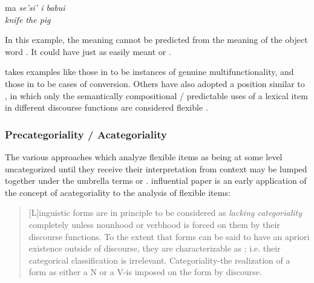 \begin{exe}
  \ex\label{ex:2.6}
  \vfix
  \gll ma       \em{se'si'} i   babui\\
        \em{knife}  the pig\\
  \vfix
\end{exe}

\noindent In this example, the meaning  cannot be predicted from the meaning of the object word . It could have just as easily meant  or .

 takes examples like those in  to be instances of genuine multifunctionality, and those in  to be cases of conversion. Others have also adopted a position similar to , in which only the semantically compositional / predictable uses of a lexical item in different discourse functions are considered flexible \parencites[§2.2.2--§2.2.3]{Croft2001b}[§3.2]{EvansOsada2005}.

\subsubsection{Precategoriality / Acategoriality}
\label{sec:2.3.1.4}

The various approaches which analyze flexible items as being at some level uncategorized until they receive their interpretation from context may be lumped together under the umbrella terms  or .  influential \parencite*{HopperThompson1984} paper is an early application of the concept of acategoriality to the analysis of flexible items:

\blockquote[{\cite[747]{HopperThompson1984}}]{[L]inguistic forms are in principle to be considered as \emph{lacking categoriality} completely unless nounhood or verbhood is forced on them by their discourse functions. To the extent that forms can be said to have an apriori existence outside of discourse, they are characterizable as ; i.e. their categorical classification is irrelevant. Categoriality-the realization of a form as either a N or a V-is imposed on the form by discourse.}

